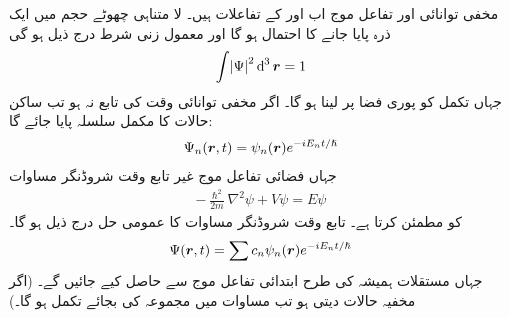 مخفی توانائی    اور تفاعل موج      اب  اور  کے تفاعلات ہیں۔ لا متناہی چھوٹے حجم   میں ایک ذرہ  پایا جانے کا احتمال
     ہو گا اور معمول زنی شرط درج ذیل ہو گی
\begin{align}
\int\abs{\Psi}^{2}\dif^{\,3}\kvec{r}=1 
\end{align}
جہاں تکمل کو پوری فضا پر لینا ہو گا۔ اگر مخفی توانائی وقت کی تابع نہ ہو  تب ساکن حالات کا مکمل سلسلہ پایا جائے گا:
\begin{align}
\Psi_{n}({{\boldsymbol{r}}},t)=\psi_{n}({{\boldsymbol{r}}})e^{-iE_{n}t/\hslash} 
\end{align}
جہاں فضائی تفاعل موج     غیر تابع وقت شروڈنگر مساوات 
\begin{align}
-\frac{\hslash^{2}}{2m}\nabla^{2}\psi+V\psi=E\psi
\end{align}
کو مطمئن کرتا ہے۔ تابع وقت شروڈنگر مساوات کا عمومی حل درج ذیل ہو گا۔
\begin{align}\label{مساوات_ابعادی_عمومی_حل_الف}
\Psi({{\boldsymbol{r}}},t)=\sum c_{n}\psi_{n}({{\boldsymbol{r}}})e^{-iE_{n}t/\hslash} 
\end{align}
جہاں مستقلات   ہمیشہ کی طرح ابتدائی تفاعل موج     سے حاصل کیے جائیں گے۔ (اگر مخفیہ     حالات دیتی ہو تب مساوات  میں مجموعہ کی بجائے تکمل ہو گا۔)


